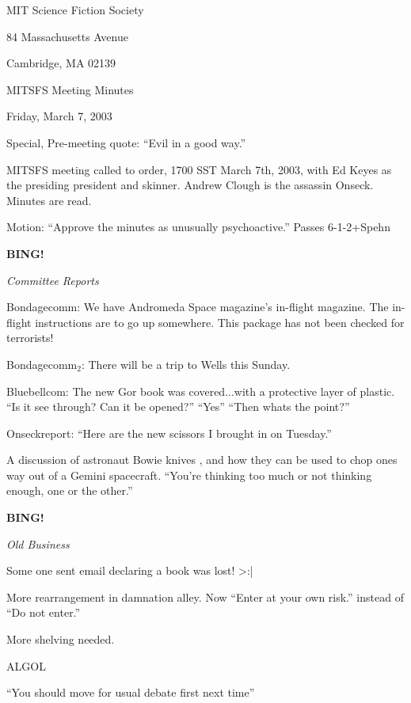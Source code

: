 \documentclass[12pt]{article}
\newcommand{\bing}{{\bf BING!} }
\newcommand{\goto}[1]{\bing \vskip 12pt \centerline{{\em{#1}}}}
\begin{document}
\begin{center}

MIT Science Fiction Society 

84 Massachusetts Avenue

Cambridge, MA 02139

\vspace{12pt}

MITSFS Meeting Minutes 

Friday, March 7, 2003

\end{center}
 
\vspace{18pt}

\setlength{\parskip}{6pt}

\noindent
Special, Pre-meeting quote:  ``Evil in a good way.''

MITSFS meeting called to order, 1700 SST March  7th, 2003, with Ed Keyes as the presiding president and skinner.  Andrew Clough is the assassin Onseck.  Minutes are read.

Motion:  ``Approve the minutes as unusually psychoactive.''  Passes 6-1-2+Spehn

\goto{Committee Reports}

Bondagecomm:  We have Andromeda Space magazine's in-flight magazine.  The in-flight instructions are to go up somewhere.  This package has not been checked for terrorists!

Bondagecomm$_2$:  There will be a trip to Wells this Sunday.

Bluebellcom:  The new Gor book was covered...with a protective layer of plastic.
``Is it see through?  Can it be opened?''  ``Yes''  ``Then whats the point?''

Onseckreport:  ``Here are the new scissors I brought in on Tuesday.''

A discussion of astronaut Bowie knives , and how they can be used to chop ones way out of a Gemini spacecraft.  ``You're thinking too much or not thinking enough, one or the other.''

\goto{Old Business}

Some one sent email declaring a book was lost! >:|

More rearrangement in damnation alley.  Now ``Enter at your own risk.''  instead of ``Do not enter.''

More shelving needed.

ALGOL

``You should move for usual debate first next time''
\end{document}
